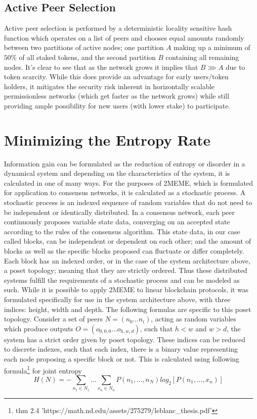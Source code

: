\documentclass{article}
\begin{document}
\subsection{Active Peer Selection}
Active peer selection is performed by a deterministic locality sensitive hash function which operates on a list of peers and chooses equal amounts randomly between two partitions of active nodes; one partition $A$ making up a minimum of $50\%$ of all staked tokens, and the second partition $B$ containing all remaining nodes. It's clear to see that as the network grows it implies that $B \ggg A$ due to token scarcity. While this does provide an advantage for early users/token holders, it mitigates the security risk inherent in horizontally scalable permissionless networks (which get faster as the network grows) while still providing ample possibility for new users (with lower stake) to participate. 


\section{Minimizing the Entropy Rate}
Information gain can be formulated as the reduction of entropy or disorder in a dynamical system and depending on the characteristics of the system, it is calculated in one of many ways. For the purposes of 2MEME, which is formulated for application to consensus networks, it is calculated as a stochastic process.
	A stochastic process is an indexed sequence of random variables that do not need to be independent or identically distributed. In a consensus network, each peer continuously proposes variable state data, converging on an accepted state according to the rules of the consensus algorithm. This state data, in our case called blocks, can be independent or dependent on each other; and the amount of blocks as well as the specific blocks proposed can fluctuate or differ completely. Each block has an indexed order, or in the case of the system architecture above, a poset topology; meaning that they are strictly ordered. Thus these distributed systems fulfill the requirements of a stochastic process and can be modeled as such. While it is possible to apply 2MEME to linear blockchain protocols, it was formulated specifically for use in the system architecture above, with three indices: height, width and depth. The following formulas are specific to this poset topology.
	Consider a set of peers $N = (n_0 …n_i)$, acting as random variables which produce outputs $O = (o_{0,0,0} … o_{h,w,d})$, such that $h<w$ and $w>d$, the system has a strict order given by poset topology. These indices can be reduced to discrete indexes, such that each index, there is a binary value representing each node proposing a specific block or not. This is calculated using following formula\footnote{thm 2.4 'https://math.nd.edu/assets/275279/leblanc\_thesis.pdf'} for joint entropy	
\begin{equation}
H(N) = -\sum_{n_1 \in N_1} \dots \sum_{x_n \in N_n} P(n_1,  \dots, n_N) log_2 [P(n_1, \dots, x_n)]
\end{equation}
	
\end{document}
